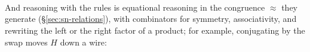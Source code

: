 \noindent\begin{minipage}[c]{0.56\textwidth}
\begin{code}%
\>[0]\AgdaSpace{}%
\AgdaSpace{}%
\AgdaSymbol{:}\AgdaSpace{}%
\AgdaSymbol{(}\AgdaSpace{}%
\AgdaSymbol{:}\AgdaSpace{}%
\AgdaSymbol{)}\AgdaSpace{}%
\AgdaSpace{}%
\AgdaSpace{}%
\AgdaSymbol{(}\AgdaSpace{}%
\AgdaSymbol{)}\AgdaSpace{}%
\<%
\\
\>[0][@{}l@{\AgdaIndent{0}}]%
\>[2]%
\>[14]\AgdaSymbol{:}\AgdaSpace{}%
\AgdaSymbol{(}\AgdaSpace{}%
\AgdaSymbol{)}\AgdaSpace{}%
%
\>[30]\AgdaSpace{}%
\AgdaOperator{\AgdaFunction{\textasciicircum{}}}\AgdaSpace{}%
\AgdaSpace{}%
\AgdaOperator{\AgdaDatatype{===}}\AgdaSpace{}%
\<%
\\
%
\>[2]%
\>[14]\AgdaSymbol{:}\AgdaSpace{}%
\AgdaSymbol{(}\AgdaSpace{}%
\AgdaSymbol{)}\AgdaSpace{}%
%
\>[30]\AgdaSpace{}%
\AgdaSpace{}%
\AgdaSpace{}%
\AgdaSpace{}%
\AgdaOperator{\AgdaDatatype{===}}\AgdaSpace{}%
\AgdaSpace{}%
\AgdaSpace{}%
\AgdaSpace{}%
\<%
\end{code}
\end{minipage}\hfill
\begin{minipage}[c]{0.42\textwidth}\centering
{}\\[3pt]
\end{minipage}

\noindent And reasoning with the rules is equational reasoning in the
congruence $\approx$ they generate (\S\ref{sec:sn-relations}), with
combinators for symmetry, associativity, and rewriting the left or the
right factor of a product; for example, conjugating by the swap moves
$H$ down a wire:

